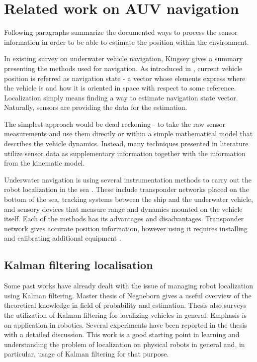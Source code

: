 \section{Related work on AUV navigation}\label{sec:lit-review}
Following paragraphs summarize the documented ways to process the sensor information in order to be able to estimate the position within the environment. 

In existing survey on underwater vehicle navigation, Kingsey \cite{kinsey06} gives a summary presenting the methods used for navigation. As introduced in \cite{kinsey06}, current vehicle position is referred as navigation state - a vector whose elements express where the vehicle is and how it is oriented in space with respect to some reference. Localization simply means finding a way to estimate navigation state vector. Naturally, sensors are providing the data for the estimation.

The simplest approach would be dead reckoning - to take the raw sensor measurements and use them directly or within a simple mathematical model that describes the vehicle dynamics. Instead, many techniques presented in literature utilize sensor data as supplementary information together with the information from the kinematic model.

Underwater navigation is using several instrumentation methods to carry out the robot localization in the sea \cite{whitcomb99}. These include transponder networks placed on the bottom of the sea, tracking systems between the ship and the underwater vehicle, and sensory devices that measure range and dynamics mounted on the vehicle itself. Each of the methods has its advantages and disadvantages. Transponder network gives accurate position information, however using it requires installing and calibrating additional equipment \cite{eustice05}.
\subsection{Kalman filtering localisation}
Some past works have already dealt with the issue of managing robot localization using Kalman filtering. Master thesis of Negneborn \cite{negenborn03} gives a useful overview of the theoretical knowledge in field of probability and estimation. Thesis also surveys the utilization of Kalman filtering for localizing vehicles in general. Emphasis is on application in robotics. Several experiments have been reported in the thesis with a detailed discussion. This work is a good starting point in learning and understanding the problem of localization on physical robots in general and, in particular, usage of Kalman filtering for that purpose.

